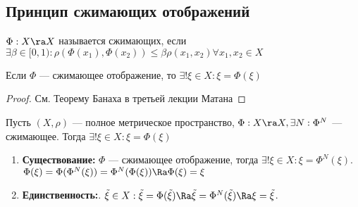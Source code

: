 \subsection{Принцип сжимающих отображений}
\begin{definition}
	\(\Phi: X \ra X\) называется сжимающих, если \(\exists \beta \in [0, 1): \rho(\Phi(x_1), \Phi(x_2)) \le \beta\rho(x_1, x_2) \forall x_1, x_2 \in X\)
\end{definition}

\begin{proposition}
	Если \(\Phi\) --- сжимающее отображение, то \(\exists ! \xi \in X: \xi = \Phi(\xi)\)
\end{proposition}
\begin{proof}
	См. Теорему Банаха в третьей лекции Матана
\end{proof}

\begin{corollary}
	Пусть \((X, \rho)\) --- полное метрическое пространство, \(\Phi: X \ra X, \exists N: \Phi^N\) --- сжимающее. Тогда \(\exists ! \xi \in X: \xi = \Phi(\xi)\)
\end{corollary}
\begin{proposition}
	\begin{enumerate}
		\item[] \textbf{Существование:} \(\Phi\) --- сжимающее отображение, тогда \(\exists! \xi \in X: \xi = \Phi^N(\xi)\). \(\Phi(\xi) = \Phi(\Phi^N(\xi)) = \Phi^N(\Phi(\xi)) \Ra \Phi(\xi) = \xi\)
		\item[] \textbf{Единственность:}. \(\tilde{\xi} \in X: \tilde{\xi} = \Phi(\tilde{\xi}) \Ra \tilde{\xi} = \Phi^N(\tilde{\xi}) \Ra \xi = \tilde{\xi}\).
	\end{enumerate}
\end{proposition}
